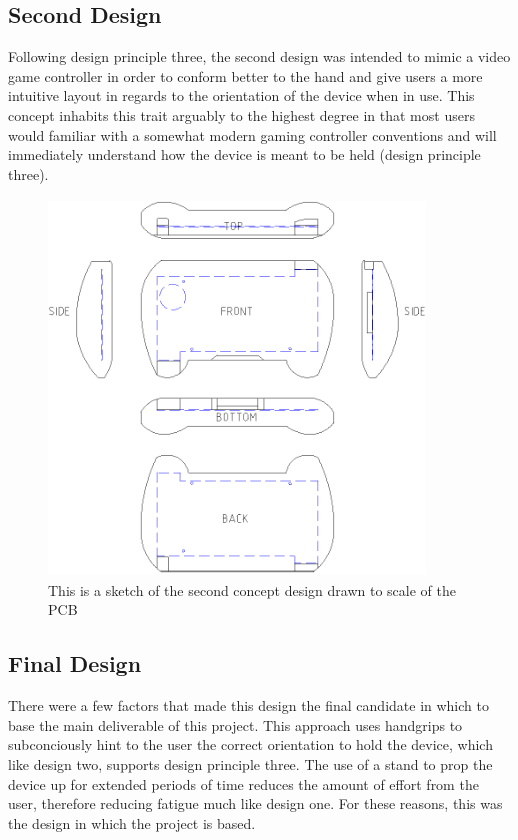 \subsection{Second Design}

Following design principle three, the second design was intended to mimic a video game controller in order to conform better to the hand and give users a more intuitive layout in regards to the orientation of the device when in use. 
This concept inhabits this trait arguably to the highest degree in that most users would familiar with a somewhat modern gaming controller conventions and will immediately understand how the device is meant to be held (design principle three).

\begin{figure} [h]
\centering
\includegraphics[width=10cm,height=10cm,keepaspectratio]{Figures/design2_sketch.png}
\caption{This is a sketch of the second concept design drawn to scale of the PCB}
\label{fig:Design_2}
\end{figure}

\subsection{Final Design}

There were a few factors that made this design the final candidate in which to base the main deliverable of this project.
This approach uses handgrips to subconciously hint to the user the correct orientation to hold the device, which like design two, supports design principle three.
The use of a stand to prop the device up for extended periods of time reduces the amount of effort from the user, therefore reducing fatigue much like design one.
For these reasons, this was the design in which the project is based.

